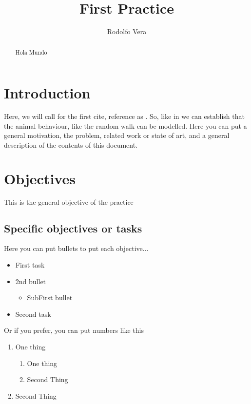 \documentclass{IEEEtran}
\title{First Practice}
\author{Rodolfo Vera}
\begin{document}
\maketitle

\begin{abstract}
     Hola Mundo
\end{abstract}

\section{Introduction} \label{introduction}

Here, we will call for the first cite, reference as \cite{van2014nature}. So, like in \cite{van2014nature,xu2015animal,xu2015animal} we can establish that the animal behaviour, like the random walk can be modelled. Here you can put a general motivation, the problem, related work or state of art, and a general description of the contents of this document.


\section{Objectives}

This is the general objective of the practice
\subsection{Specific objectives or tasks}
Here you can put bullets to put each objective...
\begin{itemize}
\item First task
\item 2nd bullet
	\begin{itemize} 
		\item SubFirst bullet
     \end{itemize}

\item Second task
\end{itemize}

Or if you prefer, you can put numbers like this
\begin{enumerate}
\item One thing
	\begin{enumerate}
		\item One thing
		\item Second Thing
	\end{enumerate}
\item Second Thing
\end{enumerate}
\end{document}
